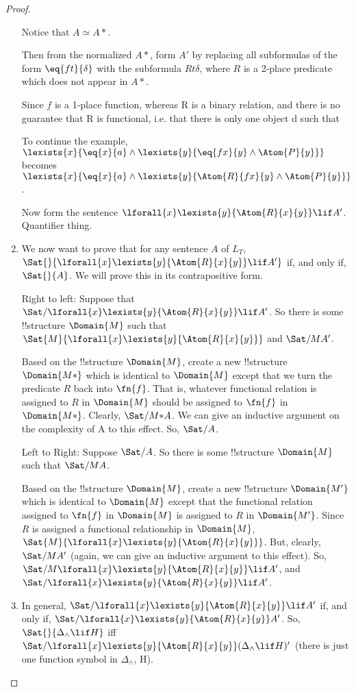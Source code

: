 \documentclass[../../include/open-logic-section]{subfiles}
\begin{document}
\begin{proof}
\begin{enumerate}
Notice that $ A \simeq A*$.

Then from the normalized $A*$, form $A'$ by replacing all subformulas of the form $\eq{ft}{\delta}$ with the subformula $R{t}{\delta}$, where $R$ is a 2-place predicate which does not appear in $A*$. 

Since $f$ is a 1-place function, whereas R is a binary relation, and there is no guarantee that R is functional, i.e. that there is only one object d such that 

To continue the example, $\lexists{x}{\eq{x}{a} \land \lexists{y}{\eq{fx}{y} \land \Atom{P}{y}}}$ becomes $\lexists{x}{\eq{x}{a} \land \lexists{y}{\Atom{R}{fx}{y} \land \Atom{P}{y}}}$.

Now form the sentence $\lforall{x}\lexists{y}{\Atom{R}{x}{y}}\lif A'$. Quantifier thing.

\item We now want to prove that for any sentence $A$ of $L_T$, $\Sat{}{\lforall{x}\lexists{y}{\Atom{R}{x}{y}}\lif A'}$ if, and only if, $\Sat{}{A}$. We will prove this in its contrapositive form.

Right to left: Suppose that $\Sat/{}{\lforall{x}\lexists{y}{\Atom{R}{x}{y}}\lif A'}$. So there is some !!{structure} $\Domain{M}$ such that  $\Sat{M}{\lforall{x}\lexists{y}{\Atom{R}{x}{y}}}$ and $\Sat/{M}{A'}$.

Based on the !!{structure} $\Domain{M}$, create a new !!{structure} $\Domain{M*}$ which is identical to $\Domain{M}$ except that we turn the predicate $R$ back into $\fn{f}$. That is, whatever functional relation is assigned to $R$ in $\Domain{M}$ should be assigned to $\fn{f}$ in $\Domain{M*}$. Clearly, $\Sat/{M*}{A}$. We can give an inductive argument on the complexity of A to this effect. So, $\Sat/{}{A}$.

Left to Right: Suppose $\Sat/{}{A}$. So there is some !!{structure} $\Domain{M}$ such that  $\Sat/{M}{A}$.

Based on the !!{structure} $\Domain{M}$, create a new !!{structure} $\Domain{M'}$ which is identical to $\Domain{M}$ except that the functional relation assigned to $\fn{f}$ in $\Domain{M}$ is assigned to $R$ in $\Domain{M'}$. Since $R$ is assigned a functional relationship in $\Domain{M}$, $\Sat{M}{\lforall{x}\lexists{y}{\Atom{R}{x}{y}}}$. But, clearly, $\Sat/{M}{A'}$ (again, we can give an inductive argument to this effect). So, $\Sat/{M}{\lforall{x}\lexists{y}{\Atom{R}{x}{y}}\lif A'}$, and $\Sat/{}{\lforall{x}\lexists{y}{\Atom{R}{x}{y}}\lif A'}$.

\item In general, $\Sat/{}{\lforall{x}\lexists{y}{\Atom{R}{x}{y}}\lif A'}$ if, and only if, $\Sat/{\lforall{x}\lexists{y}{\Atom{R}{x}{y}}}{A'}$. So, $\Sat{}{\Delta_\land \lif H}$ iff $\Sat/{\lforall{x}\lexists{y}{\Atom{R}{x}{y}}}{(\Delta_\land \lif H)'}$ (there is just one function symbol in $\Delta_\land$, H).


\end{enumerate}
\end{proof}
\end{document}
